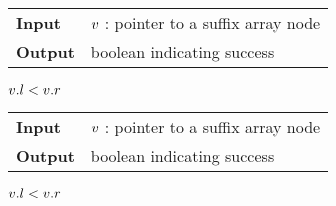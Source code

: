 \begin{figure*}[t!]
\begin{minipage}[t]{.5\textwidth}
\begin{algorithm}[H]
\begin{tabular}{ll}
\textbf{Input}  & $v$ : pointer to a suffix array node\\
\textbf{Output} & boolean indicating success\\
\end{tabular}
\begin{algorithmic}[1]
	\State \Return \False
\EndIf
{}
\EndIf
\State \Return $v.l < v.r$
\end{algorithmic}
\label{alg:sa-godown}
\end{algorithm}
\end{minipage}
\hfill
\begin{minipage}[t]{.5\textwidth}
\begin{algorithm}[H]
\begin{tabular}{ll}
\textbf{Input}  & $v$ : pointer to a suffix array node\\
\textbf{Output} & boolean indicating success\\
\end{tabular}
\begin{algorithmic}[1]
	\State \Return \False
\EndIf
{}
\EndIf
\State \Return $v.l < v.r$
\item[]
\end{algorithmic}
\label{alg:sa-goright}
\end{algorithm}
\end{minipage}
\end{figure*}

